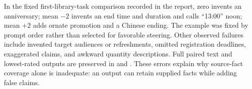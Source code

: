 In the fixed first-library-task comparison recorded in the report, zero invents an anniversary; mean $-2$ invents an end time and duration and calls ``13:00'' noon; mean $+2$ adds ornate promotion and a Chinese ending. The example was fixed by prompt order rather than selected for favorable steering. Other observed failures include invented target audiences or refreshments, omitted registration deadlines, exaggerated claims, and awkward quantity descriptions. Full paired text and lowest-rated outputs are preserved in  and . These errors explain why source-fact coverage alone is inadequate: an output can retain supplied facts while adding false claims.
